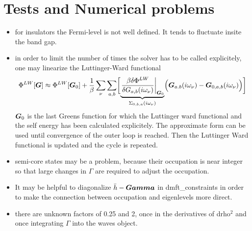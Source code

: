 \documentclass[11pt,a4paper]{report}
\begin{document}
\chapter{Tests and Numerical problems}
\begin{itemize}
%
\item for insulators the Fermi-level is not well defined. It tends to
  fluctuate insite the band gap.
%
\item in order to limit the number of times the solver has to be
  called explicitely, one may linearize the Luttinger-Ward functional
\begin{eqnarray}
\Phi^{LW}[\bm{G}]\approx \Phi^{LW}[\bm{G}_0]
+\frac{1}{\beta}\sum_\nu\sum_{a,b}\biggl[
\underbrace{
\left.\frac{\beta\delta\Phi^{LW}}{\delta{G}_{a,b}(i\omega_\nu)}\right|_{\bm{G}_0}
}_{\Sigma_{0,b,a}(i\omega_\nu)}
\Bigl(\bm{G}_{a.b}(i\omega_\nu)-\bm{G}_{0,a,b}(i\omega_\nu)\Bigr)
\biggr]
\end{eqnarray}
$\bm{G}_0$ is the last Greens function for which the Luttinger ward
functional and the self energy has been calculated explicitely. The
approximate form can be used until convergence of the outer loop is
reached. Then the Luttinger Ward functional is updated and the cycle
is repeated.
%
\item semi-core states may be a problem, because their occupation is
  near integer so that large changes in $\Gamma$ are required to
  adjust the occupation.
%
\item It may be helpful to diagonalize $\bar{h}-\bm{Gamma}$ in
  dmft\_constraints in order to make the connection between occupation
  and eigenlevels more direct.
%
\item there are unknown factors of 0.25 and 2, once in the derivatives
  of drho$^2$ and once integrating $\Gamma$ into the waves object.

\end{itemize}



\appendix
\end{document}
